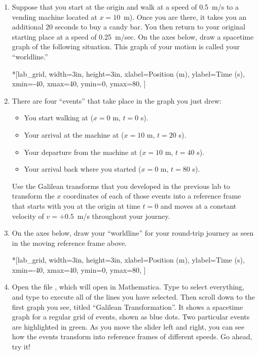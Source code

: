 \begin{enumerate}[labparts]

\item Suppose that you start at the origin and walk at a speed of 0.5~m/s to a vending machine located at $x=10$~m).  Once you are there, it takes you an additional 20 seconds to buy a candy bar.  You then return to your original starting place at a speed of 0.25~m/sec. On the axes below, draw a spacetime graph of the following situation.  This graph of your motion is called your ``worldline.''

\begin{lab_axis}*[lab_grid,
	width=3in, height=3in,
	xlabel={Position (m)},
	ylabel={Time (s)},
	xmin=-40, xmax=40,
	ymin=0, ymax=80,
	]
\end{lab_axis}

\pagebreak[2]
\item There are four ``events'' that take place in the graph you just drew:
\begin{itemize}[nosep]
\item You start walking at ($x=0$ m, $t=0$ s).
\item Your arrival at the machine at ($x=10$ m, $t=20$ s).
\item Your departure from the machine at ($x=10$ m, $t=40$ s).
\item Your arrival back where you started ($x=0$ m, $t=80$ s).
\end{itemize}
Use the Galilean transforms that you developed in the previous lab to transform the $x$ coordinates of each of those events into a reference frame that starts with you at the origin at time $t=0$ and moves at a constant velocity of $v=+0.5$~m/s throughout your journey.
\answerspace{1in}

\item On the axes below, draw your ``worldline'' for your round-trip journey as seen in the moving reference frame above.

\begin{lab_axis}*[lab_grid,
	width=3in, height=3in,
	xlabel={Position (m)},
	ylabel={Time (s)},
	xmin=-40, xmax=40,
	ymin=0, ymax=80,
	]
\end{lab_axis}

\item Open the file , which will open in Mathematica.  Type  to select everything, and type  to execute all of the lines you have selected.  Then scroll down to the first graph you see, titled ``Galilean Transformation''.    It shows a spacetime graph for a regular grid of events, shown as blue dots.  Two particular events are highlighted in green.  As you move the slider left and right, you can see how the events transform into reference frames of different speeds.  Go ahead, try it!


\end{enumerate}
